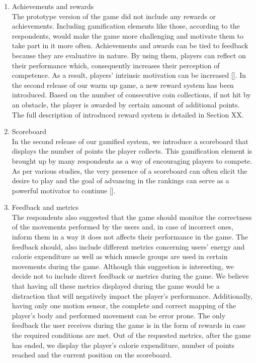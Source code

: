 \begin{enumerate}
\begin{enumerate}
\item Achievements and rewards\\
The prototype version of the game did not include any rewards or achievements. Including gamification elements like those, according to the respondents, would make the game more challenging and motivate them to take part in it more often. Achievements and awards can be tied to feedback because they are evaluative in nature. By using them, players can reflect on their performance which, consequently increases their perception of competence.  As a result, players' intrinsic motivation can be increased []. In the second release of our warm up game, a new reward system has been introduced. Based on the number of consecutive coin collections, if not hit by an obstacle, the player is awarded by certain amount of additional points. The full description of introduced reward system is detailed in Section XX. 
\item Scoreboard\\
In the second release of our gamified system, we introduce a scoreboard that displays the number of points the player collects. This gamification element is brought up by many respondents as a way of encouraging players to compete. As per various studies, the very presence of a scoreboard can often elicit the desire to play and the goal of advancing in the rankings can serve as a powerful motivator to continue []. 
\item Feedback and metrics\\
The respondents also suggested that the game should monitor the correctness of the movements performed by the users and, in case of incorrect ones, inform them in a way it does not affects their performance in the game. The feedback should, also include different metrics concerning users' energy and calorie expenditure as well as which muscle groups are used in certain movements during the game. Although this suggestion is interesting, we decide not to include direct feedback or metrics during the game. We believe that having all these metrics displayed during the game would be a distraction that will negatively impact the player's performance. Additionally, having only one motion sensor, the complete and correct mapping of the player's body and performed movement can be error prone. The only feedback the user receives during the game is in the form of rewards in case the required conditions are met. Out of the requested metrics, after the game has ended, we display the player's calorie expenditure, number of points reached and the current position on the scoreboard.  

\end{enumerate}
\end{enumerate}

